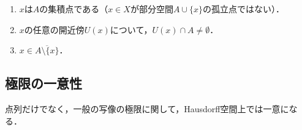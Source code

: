 \documentclass[uplatex,dvipdfmx]{jsreport}
\begin{document}
\begin{lemma}[集積点の特徴付け]\mbox{}
    \begin{enumerate}
        \item $x$は$A$の集積点である（$x\in X$が部分空間$A\cup\{x\}$の孤立点ではない）．
        \item $x$の任意の開近傍$U(x)$について，$U(x)\cap A\ne\emptyset$．
        \item $x\in\overline{A\setminus\{x\}}$．
    \end{enumerate}
\end{lemma}

\subsection{極限の一意性}

\begin{tcolorbox}[colframe=ForestGreen, colback=ForestGreen!10!white,breakable,colbacktitle=ForestGreen!40!white,coltitle=black,fonttitle=\bfseries\sffamily,
title=]
    点列だけでなく，一般の写像の極限に関して，Hausdorff空間上では一意になる．
\end{tcolorbox}
\end{document}
